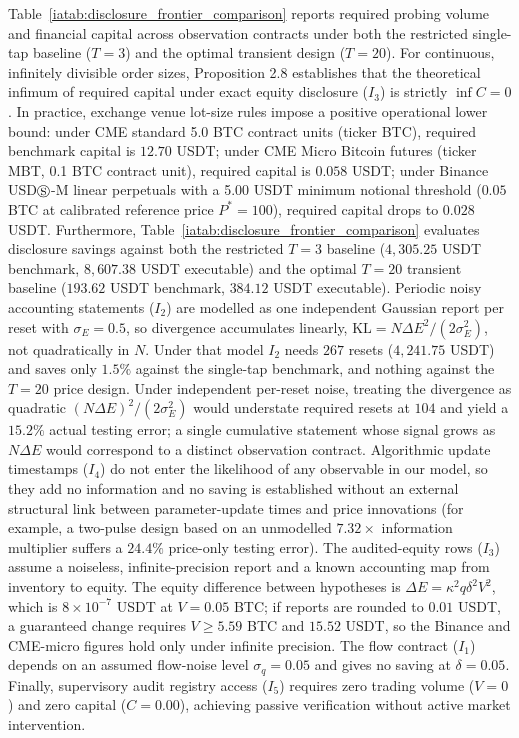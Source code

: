 \documentclass[12pt]{article}
\theoremstyle{definition}
\theoremstyle{remark}
\begin{document}
Table~\ref{iatab:disclosure_frontier_comparison} reports required probing volume and financial capital across observation contracts under both the restricted single-tap baseline ($T=3$) and the optimal transient design ($T=20$). For continuous, infinitely divisible order sizes, Proposition 2.8 establishes that the theoretical infimum of required capital under exact equity disclosure ($I_3$) is strictly $\inf C = 0$. In practice, exchange venue lot-size rules impose a positive operational lower bound: under CME standard 5.0 BTC contract units (ticker BTC), required benchmark capital is $12.70$ USDT; under CME Micro Bitcoin futures (ticker MBT, 0.1 BTC contract unit), required capital is $0.058$ USDT; under Binance USD$\circledS$-M linear perpetuals with a 5.00 USDT minimum notional threshold ($0.05$ BTC at calibrated reference price $P^* = 100$), required capital drops to $0.028$ USDT. Furthermore, Table~\ref{iatab:disclosure_frontier_comparison} evaluates disclosure savings against both the restricted $T=3$ baseline ($4{,}305.25$ USDT benchmark, $8{,}607.38$ USDT executable) and the optimal $T=20$ transient baseline ($193.62$ USDT benchmark, $384.12$ USDT executable). Periodic noisy accounting statements ($I_2$) are modelled as one independent Gaussian report per reset with $\sigma_E=0.5$, so divergence accumulates linearly, $\mathrm{KL}=N\Delta E^2/(2\sigma_E^2)$, not quadratically in $N$. Under that model $I_2$ needs $267$ resets ($4{,}241.75$ USDT) and saves only $1.5\%$ against the single-tap benchmark, and nothing against the $T=20$ price design. Under independent per-reset noise, treating the divergence as quadratic $(N\Delta E)^2/(2\sigma_E^2)$ would understate required resets at $104$ and yield a $15.2\%$ actual testing error; a single cumulative statement whose signal grows as $N\Delta E$ would correspond to a distinct observation contract. Algorithmic update timestamps ($I_4$) do not enter the likelihood of any observable in our model, so they add no information and no saving is established without an external structural link between parameter-update times and price innovations (for example, a two-pulse design based on an unmodelled $7.32\times$ information multiplier suffers a $24.4\%$ price-only testing error). The audited-equity rows ($I_3$) assume a noiseless, infinite-precision report and a known accounting map from inventory to equity. The equity difference between hypotheses is $\Delta E=\kappa^2 q\delta^2V^2$, which is $8\times10^{-7}$ USDT at $V=0.05$ BTC; if reports are rounded to $0.01$ USDT, a guaranteed change requires $V\ge5.59$ BTC and $15.52$ USDT, so the Binance and CME-micro figures hold only under infinite precision. The flow contract ($I_1$) depends on an assumed flow-noise level $\sigma_q=0.05$ and gives no saving at $\delta=0.05$. Finally, supervisory audit registry access ($I_5$) requires zero trading volume ($V=0$) and zero capital ($C=0.00$), achieving passive verification without active market intervention.
\end{document}
